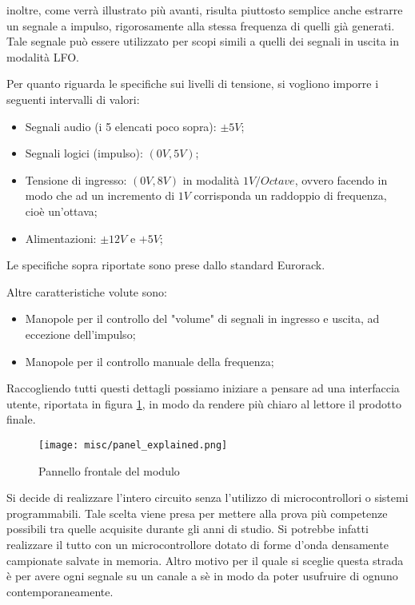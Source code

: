 inoltre, come verrà illustrato più avanti, risulta piuttosto semplice anche estrarre un
segnale a impulso, rigorosamente alla stessa frequenza di quelli già generati. Tale segnale
può essere utilizzato per scopi simili a quelli dei segnali in uscita in modalità LFO.
\smallskip

Per quanto riguarda le specifiche sui livelli di tensione, si vogliono imporre i seguenti
intervalli di valori:

\begin{itemize}
    \item Segnali audio (i 5 elencati poco sopra): $\pm5V$;
    \item Segnali logici (impulso): $(0V,5V)$;
    \item Tensione di ingresso: $(0V,8V)$ in modalità $1V/Octave$, ovvero facendo in modo che
          ad un incremento di $1V$ corrisponda un raddoppio di frequenza, cioè un'ottava;
    \item Alimentazioni: $\pm12V$ e $+5V$;
\end{itemize}

Le specifiche sopra riportate sono prese dallo standard Eurorack.

Altre caratteristiche volute sono:

\begin{itemize}
    \item Manopole per il controllo del "volume" di segnali in ingresso e uscita, ad eccezione
          dell'impulso;
    \item Manopole per il controllo manuale della frequenza;
\end{itemize}

Raccogliendo tutti questi dettagli possiamo iniziare a pensare ad una interfaccia utente,
riportata in figura \ref{panel_explained}, in modo da rendere più chiaro al lettore il
prodotto finale.
\medskip

\begin{figure}[ht]
    \centering
    \texttt{[image: misc/panel\_explained.png]}
    \caption{Pannello frontale del modulo}
    \label{panel_explained}
\end{figure}

Si decide di realizzare l'intero circuito senza l'utilizzo di microcontrollori o sistemi
programmabili. Tale scelta viene presa per mettere alla prova più competenze possibili tra
quelle acquisite durante gli anni di studio. Si potrebbe infatti realizzare il tutto con un
microcontrollore dotato di forme d'onda densamente campionate salvate in memoria.
Altro motivo per il quale si sceglie questa strada è per avere ogni segnale su un canale
a sè in modo da poter usufruire di ognuno contemporaneamente.

